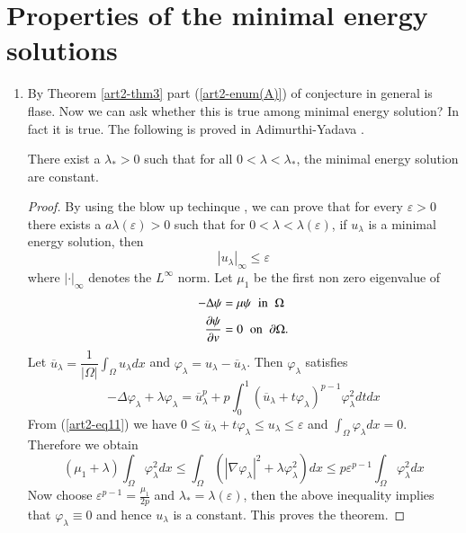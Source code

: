 \section*{Properties of the minimal energy solutions}
\begin{enumerate}[{\rm \bf 1.}]
\item By Theorem \ref{art2-thm3} part (\ref{art2-enum(A)}) of conjecture in general is flase. Now we can ask whether this is true among minimal energy solution? In fact it is true. The following is proved in Adimurthi-Yadava \cite{art2-key6}.\label{art2-enum1}  
\begin{theorem}
There exist a $\lambda_{*} > 0$ such that for all $0 < \lambda < \lambda_{*}$, the minimal energy solution are constant.\label{art2-thm5}
\end{theorem}

\begin{proof}
By using the blow up techinque \cite{art2-key13}, we can prove that for every $\varepsilon > 0$ there exists a $a\lambda(\varepsilon) > 0$ such that for $0 < \lambda < \lambda(\varepsilon)$, if $u_{\lambda}$ is a minimal energy solution, then
\begin{equation}
|u_{\lambda}|_{\infty} \leq \varepsilon \label{art2-eq11}
\end{equation}
where $|\cdot|_{\infty}$ denotes the $L^{\infty}$ norm. Let $\mu_{1}$ be the first non zero eigenvalue of 
\begin{align*}
-\Delta \psi &= \mu \psi \;\; {\rm in}\;\; \Omega\\
\dfrac{\partial \psi}{\partial v} &= 0 \;\; {\rm on} \;\; \partial \Omega. 
\end{align*}
Let $\overline{u}_{\lambda} = \dfrac{1}{|\Omega|} \int_{\Omega}u_{\lambda}dx$ and $\varphi_{\lambda} = u_{\lambda} - \overline{u}_{\lambda}$. Then $\varphi_{\lambda}$ satisfies
$$
-\Delta \varphi_{\lambda} + \lambda\varphi_{\lambda} = \overline{u}_{\lambda}^{p} + p \int_{0}^{1}\left(\overline{u}_{\lambda} + t\varphi_{\lambda}\right)^{p-1} \varphi_{\lambda}^{2}dtdx
$$
From (\ref{art2-eq11}) we have $0\leq \overline{u}_{\lambda} + t\varphi_{\lambda} \leq u_{\lambda} \leq \varepsilon$ and $\int_{\Omega} \varphi_{\lambda}dx = 0$. Therefore we obtain
$$
(\mu_{1}+ \lambda) \int_{\Omega}\varphi_{\lambda}^{2}dx \leq \int_{\Omega}\left(|\nabla\varphi_{\lambda}|^{2} + \lambda \varphi_{\lambda}^{2}\right)dx \leq p \varepsilon^{p-1} \int_{\Omega} \varphi_{\lambda}^{2}dx
$$
Now choose $\varepsilon^{p-1} = \frac{\mu_{1}}{2p}$ and $\lambda_{*} = \lambda(\varepsilon)$, then the above inequality implies that $\varphi_{\lambda}\equiv 0$ and hence $u_{\lambda}$ is a constant. This proves the theorem.
\end{proof}


\end{enumerate}

